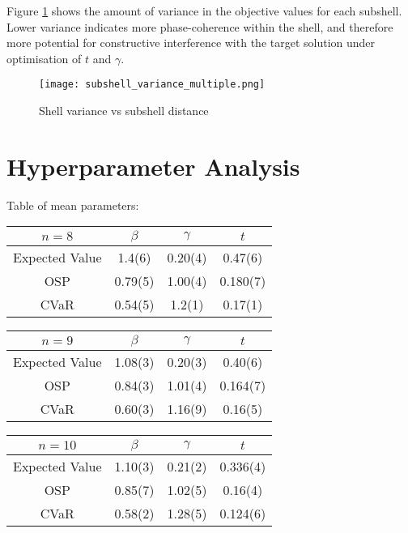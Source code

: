 Figure \ref{fig:shell variance} shows the amount of variance in the objective values for each subshell.
Lower variance indicates more phase-coherence within the shell, and therefore more potential for constructive interference with the target solution under optimisation of $t$ and $\gamma$.
\begin{figure}[htbp]
    \centering
    \texttt{[image: subshell\_variance\_multiple.png]}
    \caption{Shell variance vs subshell distance}
    \label{fig:shell variance}
\end{figure}

\section{Hyperparameter Analysis}
Table of mean parameters:

\begin{tabular}{c|c|c|c}
    $n=8$          & $\beta$ & $\gamma$ & $t$     \\\hline
    Expected Value & 1.4(6)  & 0.20(4)  & 0.47(6) \\\hline
    OSP            & 0.79(5) & 1.00(4)  & 0.180(7)\\\hline
    CVaR           & 0.54(5) & 1.2(1)   & 0.17(1) 
\end{tabular}

\begin{tabular}{c|c|c|c}
    $n=9$          & $\beta$ & $\gamma$ & $t$     \\\hline
    Expected Value & 1.08(3) & 0.20(3)  & 0.40(6) \\\hline
    OSP            & 0.84(3) & 1.01(4)  & 0.164(7)\\\hline
    CVaR           & 0.60(3) & 1.16(9)  & 0.16(5) 
\end{tabular}

\begin{tabular}{c|c|c|c}
    $n=10$         & $\beta$ & $\gamma$ & $t$     \\\hline
    Expected Value & 1.10(3) & 0.21(2)  & 0.336(4)\\\hline
    OSP            & 0.85(7) & 1.02(5)  & 0.16(4) \\\hline
    CVaR           & 0.58(2) & 1.28(5)  & 0.124(6)
\end{tabular}
